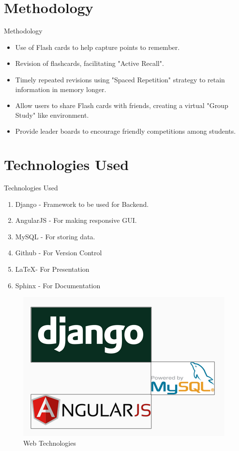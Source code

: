 \documentclass[10pt]{beamer}
\begin{document}
\section{Methodology}
\begin{frame}{Methodology}
\begin{itemize}
    \item Use of Flash cards to help capture points to remember.
    \item Revision of flashcards, facilitating "Active Recall".
    \item Timely repeated revisions using "Spaced Repetition" strategy to retain information in memory longer.
    \item Allow users to share Flash cards with friends, creating a virtual "Group Study" like environment.
    \item Provide leader boards to encourage friendly competitions among students.
\end{itemize}

\end{frame}
\section{Technologies Used}

\begin{frame}{Technologies Used}
\begin{enumerate}
    \item Django - Framework to be used for Backend.
    \item AngularJS - For making responsive GUI.
    \item MySQL - For storing data.
    \item Github - For Version Control
    \item \LaTeX - For Presentation
    \item Sphinx - For Documentation

\end{enumerate}

\begin{figure}
    \centering
    \includegraphics[scale=0.3]{Tech.png}
    \caption{Web Technologies \cite{Django}\cite{AngularJS}\cite{MySQL}}
    \label{fig:3tech}
\end{figure}

\end{frame}
\end{document}
